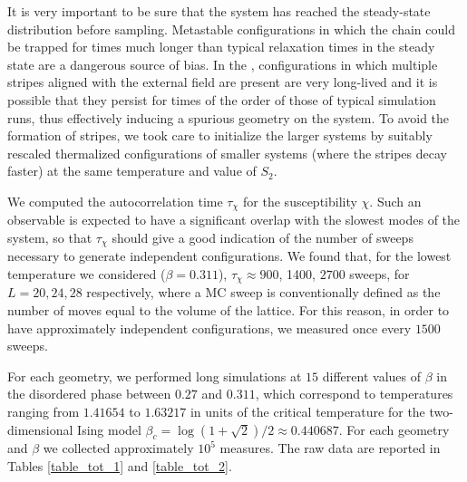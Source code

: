 \documentclass[12pt]{article}
\begin{document}
It is very important to be sure that the system has reached the steady-state
distribution before sampling. 
Metastable configurations in which the chain could be trapped for times
much longer than typical relaxation times in the steady state are
a dangerous source of bias. In the \dlg ,
configurations in which multiple stripes aligned with the external
field are present are very long-lived and it is possible that
they persist for times of the order of those of typical simulation runs, thus
effectively inducing a spurious geometry on the system. To avoid the
formation of stripes, we took care to
initialize the larger systems by suitably rescaled thermalized configurations
of smaller systems (where the stripes decay faster) at the same temperature
and value of $S_2$.  

We computed the autocorrelation time $\tau_\chi$ for the susceptibility $\chi$. 
Such an observable is expected to have a significant overlap with the slowest 
modes of the system, so that $\tau_\chi$ should give a good indication 
of the number of sweeps necessary to generate independent configurations.
We found that, for the lowest temperature we considered ($\beta=0.311$), 
$\tau_\chi \approx 900$, 1400, $2700$  sweeps, for $L=20,24,28$
respectively,  where a MC sweep is 
conventionally defined as the number of moves
equal to the volume of the lattice. For this reason, in order to have 
approximately independent configurations, we measured once every 
$1500$ sweeps. 

For each geometry, we performed long simulations 
at $15$ different values of $\beta$ in the disordered phase
between $0.27$ and $0.311$, which correspond to temperatures ranging 
from $1.41654$ to
$1.63217$ in units of the critical temperature for the 
two-dimensional Ising model $\beta_c
= \log(1+\sqrt{2})/2 \approx 0.440687$.  
For each geometry and $\beta$ we collected approximately $10^5$ measures.
The raw data are reported in Tables \ref{table_tot_1} and \ref{table_tot_2}.
\end{document}
